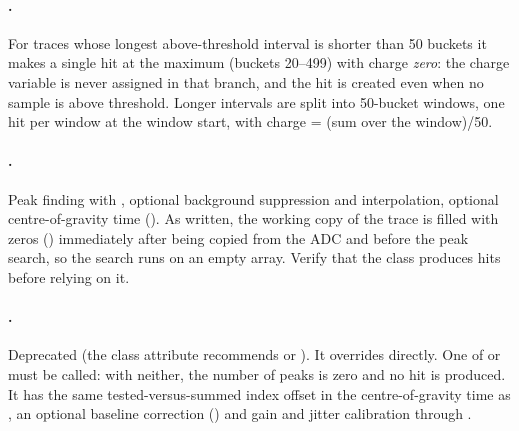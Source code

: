 \paragraph{.} For traces whose longest above-threshold interval is shorter than 50
buckets it makes a single hit at the maximum (buckets 20--499) with charge \emph{zero}: the charge
variable is never assigned in that branch, and the hit is created even when no sample is above
threshold. Longer intervals are split into 50-bucket windows, one hit per window at the window
start, with charge = (sum over the window)/50.

\paragraph{.} Peak finding with , optional
background suppression and interpolation, optional centre-of-gravity time
(). As written, the working copy of the trace is filled with zeros
() immediately after being copied from the ADC and before the peak search, so
the search runs on an empty array. Verify that the class produces hits before relying on it.

\paragraph{.} Deprecated (the class attribute recommends  or
). It overrides  directly. One of  or
 must be called: with neither, the number of peaks is zero and no hit is
produced. It has the same tested-versus-summed index offset in the centre-of-gravity time as
, an optional baseline correction () and gain and jitter
calibration through .

